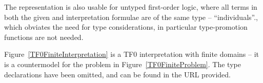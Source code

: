 \documentclass[letterpaper]{article}
\begin{document}
{%
The representation is also usable for untyped first-order logic, where all terms in both the 
given and interpretation formulae are of the same type -- ``individuals''., which obviates the 
need for type considerations, in particular type-promotion functions are not needed.
 
Figure~\ref{TF0FiniteInterpretation} is a TF0 interpretation with finite domains -- it is a 
countermodel for the problem in Figure~\ref{TF0FiniteProblem}.
The type declarations have been omitted, and can be found in the URL provided.

}
\end{document}
